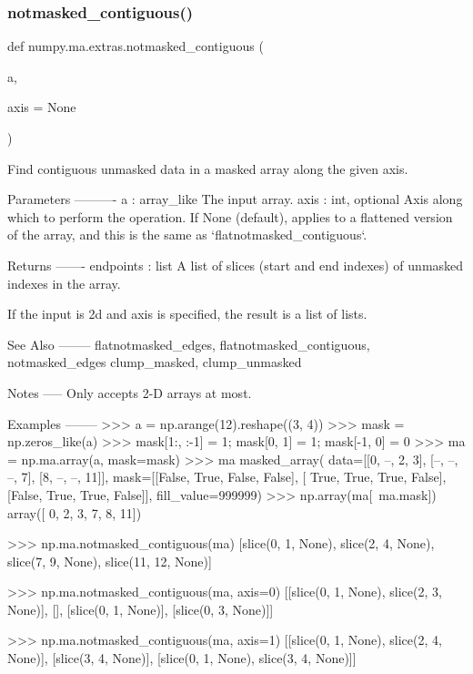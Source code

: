 \subsubsection{\texorpdfstring{notmasked\+\_\+contiguous()}{notmasked\_contiguous()}}
{\footnotesize\ttfamily def numpy.\+ma.\+extras.\+notmasked\+\_\+contiguous (\begin{DoxyParamCaption}\item[{}]{a,  }\item[{}]{axis = {\ttfamily None} }\end{DoxyParamCaption})}

\begin{DoxyVerb}Find contiguous unmasked data in a masked array along the given axis.

Parameters
----------
a : array_like
    The input array.
axis : int, optional
    Axis along which to perform the operation.
    If None (default), applies to a flattened version of the array, and this
    is the same as `flatnotmasked_contiguous`.

Returns
-------
endpoints : list
    A list of slices (start and end indexes) of unmasked indexes
    in the array.

    If the input is 2d and axis is specified, the result is a list of lists.

See Also
--------
flatnotmasked_edges, flatnotmasked_contiguous, notmasked_edges
clump_masked, clump_unmasked

Notes
-----
Only accepts 2-D arrays at most.

Examples
--------
>>> a = np.arange(12).reshape((3, 4))
>>> mask = np.zeros_like(a)
>>> mask[1:, :-1] = 1; mask[0, 1] = 1; mask[-1, 0] = 0
>>> ma = np.ma.array(a, mask=mask)
>>> ma
masked_array(
  data=[[0, --, 2, 3],
        [--, --, --, 7],
        [8, --, --, 11]],
  mask=[[False,  True, False, False],
        [ True,  True,  True, False],
        [False,  True,  True, False]],
  fill_value=999999)
>>> np.array(ma[~ma.mask])
array([ 0,  2,  3,  7, 8, 11])

>>> np.ma.notmasked_contiguous(ma)
[slice(0, 1, None), slice(2, 4, None), slice(7, 9, None), slice(11, 12, None)]

>>> np.ma.notmasked_contiguous(ma, axis=0)
[[slice(0, 1, None), slice(2, 3, None)], [], [slice(0, 1, None)], [slice(0, 3, None)]]

>>> np.ma.notmasked_contiguous(ma, axis=1)
[[slice(0, 1, None), slice(2, 4, None)], [slice(3, 4, None)], [slice(0, 1, None), slice(3, 4, None)]]\end{DoxyVerb}
 \mbox{\label{namespacenumpy_1_1ma_1_1extras_a70ecd3b49d812ea251ced5430894f41e}} 
